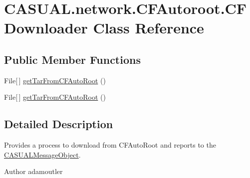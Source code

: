 \hypertarget{class_c_a_s_u_a_l_1_1network_1_1_c_f_autoroot_1_1_c_f_downloader}{\section{C\-A\-S\-U\-A\-L.\-network.\-C\-F\-Autoroot.\-C\-F\-Downloader Class Reference}
\label{class_c_a_s_u_a_l_1_1network_1_1_c_f_autoroot_1_1_c_f_downloader}
}
\subsection*{Public Member Functions}
\begin{DoxyCompactItemize}
\item 
File\mbox{[}$\,$\mbox{]} \hyperlink{class_c_a_s_u_a_l_1_1network_1_1_c_f_autoroot_1_1_c_f_downloader_a8453e82309c1c019565b91f25c6bdc8d}{get\-Tar\-From\-C\-F\-Auto\-Root} ()
\item 
File\mbox{[}$\,$\mbox{]} \hyperlink{class_c_a_s_u_a_l_1_1network_1_1_c_f_autoroot_1_1_c_f_downloader_a8453e82309c1c019565b91f25c6bdc8d}{get\-Tar\-From\-C\-F\-Auto\-Root} ()
\end{DoxyCompactItemize}


\subsection{Detailed Description}
Provides a process to download from C\-F\-Auto\-Root and reports to the \hyperlink{class_c_a_s_u_a_l_1_1_c_a_s_u_a_l_message_object}{C\-A\-S\-U\-A\-L\-Message\-Object}. \begin{DoxyAuthor}{Author}
adamoutler 
\end{DoxyAuthor}


